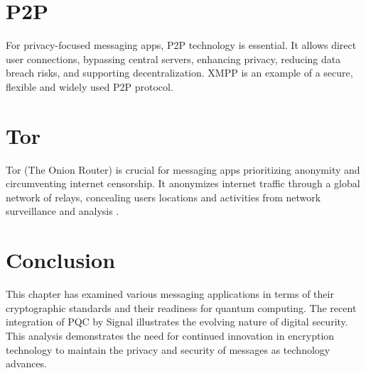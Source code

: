 \section{P2P}
For privacy-focused messaging apps, P2P technology is essential. It allows direct user connections, bypassing central servers, enhancing privacy, reducing data breach risks, and supporting decentralization. XMPP \cite{xmpp2023website} is an example of a secure, flexible and widely used P2P protocol.

\section{Tor}
Tor (The Onion Router) is crucial for messaging apps prioritizing anonymity and circumventing internet censorship. It anonymizes internet traffic through a global network of relays, concealing users locations and activities from network surveillance and analysis \cite{torproject2023website}.

\section{Conclusion}
This chapter has examined various messaging applications in terms of their cryptographic standards and their readiness for quantum computing. The recent integration of PQC by Signal illustrates the evolving nature of digital security. This analysis demonstrates the need for continued innovation in encryption technology to maintain the privacy and security of messages as technology advances.

